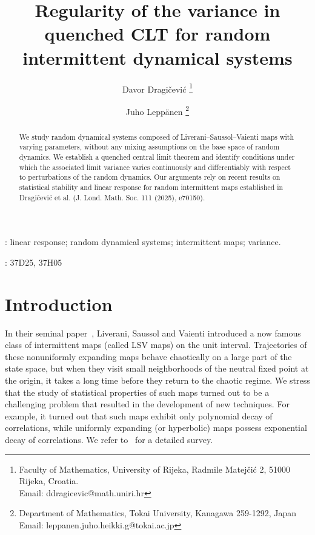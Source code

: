 \documentclass[12pt,reqno,a4paper]{article}
\begin{document}
	
	\title{Regularity of the variance in quenched CLT for random intermittent dynamical systems}
	\author{Davor Dragi\v cevi\' c
		\thanks{Faculty of Mathematics, University of Rijeka, Radmile Matej\v ci\' c 2, 51000 Rijeka, Croatia.\\ Email: ddragicevic@math.uniri.hr}
		\and
		Juho Lepp{\"a}nen \thanks{Department of Mathematics, Tokai University, Kanagawa 259-1292, Japan\\ Email: leppanen.juho.heikki.g@tokai.ac.jp}
	}
	
	
	
	\maketitle
	
	\begin{abstract}
		We study random dynamical systems composed of Liverani--Saussol--Vaienti maps with varying parameters, without any mixing assumptions on the base space of random dynamics. We establish a quenched central limit theorem and identify conditions under which the associated limit variance varies continuously and differentiably with respect to perturbations of the random dynamics. Our arguments rely on recent results on statistical stability and linear response for random intermittent maps established in Dragičević et al. (J. Lond. Math. Soc. 111 (2025), e70150).
	\end{abstract}
	
	
	\vspace{3mm}
	
	: linear response; random dynamical systems; intermittent maps; variance.
	\vspace{2mm}
	
	: 37D25, 37H05
	
	\section{Introduction}
	
	In their seminal paper~\cite{LSV}, Liverani, Saussol and Vaienti introduced a now famous class of intermittent maps (called LSV maps) on the unit interval. 
	Trajectories of these nonuniformly expanding maps behave chaotically on a large part of
	the state space, but when they visit small neighborhoods of the neutral fixed point at the origin, it
	takes a long time before they return to the chaotic regime. We stress that the study of statistical properties of such maps turned out to be a challenging problem that resulted in the development of new techniques. For example, it turned out that such maps exhibit only polynomial decay of correlations, while uniformly expanding (or hyperbolic) maps possess exponential decay of correlations.  We refer to~\cite{alvesbook} for a detailed survey.
	
\end{document}
